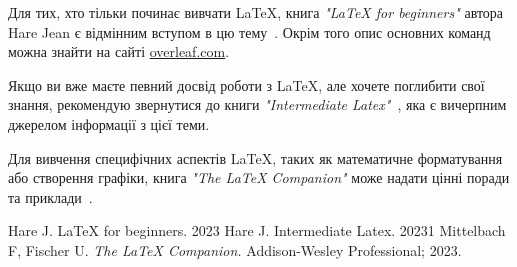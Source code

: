 	Для тих, хто тільки починає вивчати LaTeX, книга \textit{"LaTeX for beginners"} автора Hare Jean є відмінним вступом в цю тему~\cite{latexbegin}. Окрім того опис основних команд можна знайти на сайті \href{https://www.overleaf.com/learn}{overleaf.com}.
	
	Якщо ви вже маєте певний досвід роботи з LaTeX, але хочете поглибити свої знання, рекомендую звернутися до книги \textit{"Intermediate Latex"}~\cite{latexintermid}, яка є вичерпним джерелом інформації з цієї теми.
	
	Для вивчення специфічних аспектів LaTeX, таких як математичне форматування або створення графіки, книга \textit{"The LaTeX Companion"} може надати цінні поради та приклади~\cite{latexguide}.
	
	\newpage
	
	\begin{thebibliography}{9}
			Hare J. LaTeX for beginners. 2023
		 	Hare J. Intermediate Latex. 20231
		  Mittelbach F, Fischer U. 
		\textit{The LaTeX Companion.}  
		Addison-Wesley Professional; 2023.

	\end{thebibliography}
	\newpage
	\appendix
	
